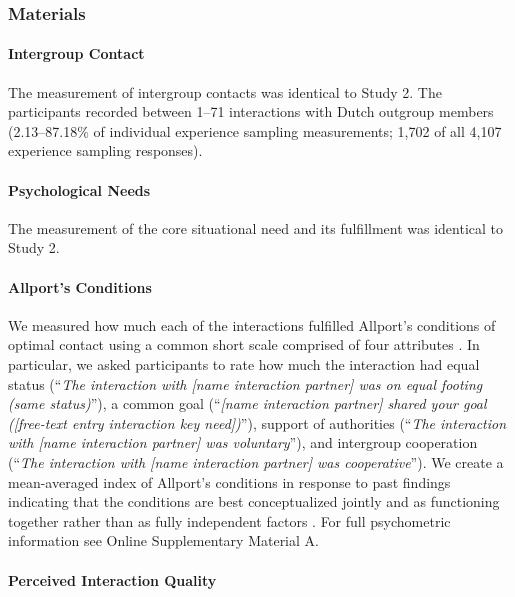 \subsubsection{Materials}

\paragraph{Intergroup Contact}

The measurement of intergroup contacts was identical to Study 2. The
participants recorded between 1--71 interactions with Dutch outgroup
members (2.13--87.18\% of individual experience sampling measurements;
1,702 of all 4,107 experience sampling responses).

\paragraph{Psychological Needs}

The measurement of the core situational need and its fulfillment was
identical to Study 2.

\paragraph{Allport's Conditions}

We measured how much each of the interactions fulfilled Allport's
conditions of optimal contact using a common short scale comprised of
four attributes \citep{Islam1993, Voci2003, AlRamiah2012a}. In
particular, we asked participants to rate how much the interaction had
equal status
(``\textit{The interaction with [name interaction partner] was on equal footing (same status)}''),
a common goal
(``\textit{[name interaction partner] shared your goal ([free-text entry interaction key need])}''),
support of authorities
(``\textit{The interaction with [name interaction partner] was voluntary}''),
and intergroup cooperation
(``\textit{The interaction with [name interaction partner] was cooperative}'').
We create a mean-averaged index of Allport's conditions in response to
past findings indicating that the conditions are best conceptualized
jointly and as functioning together rather than as fully independent
factors \citep[][, p. 766]{Pettigrew2006}. For full psychometric
information see Online Supplementary Material A.

\paragraph{Perceived Interaction Quality}

